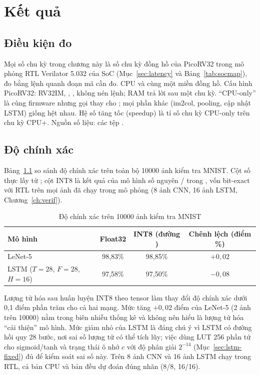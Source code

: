 \chapter{Kết quả}
\label{ch:results}

\section{Điều kiện đo}
Mọi số chu kỳ trong chương này là số chu kỳ đồng hồ của PicoRV32 trong mô phỏng RTL Verilator 5.032 của SoC (Mục~\ref{sec:latency} và Bảng~\ref{tab:socmap}), đo bằng lệnh  quanh đoạn mã cần đo. CPU và \NPU{} cùng một miền đồng hồ. Cấu hình PicoRV32: RV32IM, , , không nén lệnh; RAM trả lời sau một chu kỳ. ``CPU-only'' là cùng firmware nhưng gọi  thay cho ; mọi phần khác (im2col, pooling, cập nhật LSTM) giống hệt nhau. Hệ số tăng tốc (speedup) là tỉ số chu kỳ CPU-only trên chu kỳ CPU+\NPU{}. Nguồn số liệu: các tệp .

\section{Độ chính xác}
\label{sec:res-acc}
Bảng~\ref{tab:accuracy} so sánh độ chính xác trên toàn bộ \num{10000} ảnh kiểm tra MNIST. Cột số thực lấy từ ; cột INT8 là kết quả của mô hình số nguyên / trong , vốn bit-exact với RTL trên mọi ảnh đã chạy trong mô phỏng (8 ảnh CNN, 16 ảnh LSTM, Chương~\ref{ch:verif}).

\begin{table}[H]
  \centering
  \caption{Độ chính xác trên \num{10000} ảnh kiểm tra MNIST}
  \label{tab:accuracy}
  \begin{tabular}{lccc}
    \toprule
    Mô hình & Float32 & INT8 (đường \NPU{}) & Chênh lệch (điểm \%) \\
    \midrule
    LeNet-5 & 98,83\% & 98,85\% & $+0{,}02$ \\
    LSTM ($T=28$, $F=28$, $H=16$) & 97,58\% & 97,50\% & $-0{,}08$ \\
    \bottomrule
  \end{tabular}
\end{table}

Lượng tử hóa sau huấn luyện INT8 theo tensor làm thay đổi độ chính xác dưới 0,1 điểm phần trăm cho cả hai mạng. Mức tăng $+0{,}02$ điểm của LeNet-5 (2 ảnh trên \num{10000}) nằm trong biên nhiễu thống kê và không nên hiểu là lượng tử hóa ``cải thiện'' mô hình. Mức giảm nhỏ của LSTM là đáng chú ý vì LSTM có đường hồi quy 28 bước, nơi sai số lượng tử có thể tích lũy; việc dùng LUT 256 phần tử cho sigmoid/tanh và trạng thái ô nhớ $c$ với độ phân giải $2^{-14}$ (Mục~\ref{sec:lstm-fixed}) đủ để kiểm soát sai số này. Trên 8 ảnh CNN và 16 ảnh LSTM chạy trong RTL, cả bản CPU và bản \NPU{} đều dự đoán đúng nhãn (8/8, 16/16).

